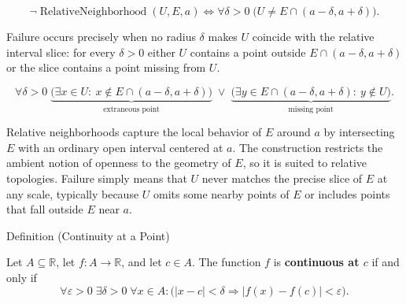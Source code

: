 \begin{remark*}
\[
\neg \operatorname{RelativeNeighborhood}(U,E,a)
\Longleftrightarrow
\forall \delta > 0\;
\bigl(U \ne E \cap (a-\delta, a+\delta)\bigr).
\]
\end{remark*}

\begin{remark*}
Failure occurs precisely when no radius $\delta$ makes $U$ coincide with the relative interval slice: for every $\delta > 0$ either $U$ contains a point outside $E \cap (a-\delta,a+\delta)$ or the slice contains a point missing from $U$.
\end{remark*}

\begin{remark*}
\[
\forall \delta > 0\;
\underbrace{\bigl(\exists x \in U:\ x \notin E \cap (a-\delta,a+\delta)\bigr)}_{\text{extraneous point}}
\;\lor\;
\underbrace{\bigl(\exists y \in E \cap (a-\delta,a+\delta):\ y \notin U\bigr)}_{\text{missing point}}.
\]
\end{remark*}

\begin{remark*}[Interpretation]
Relative neighborhoods capture the local behavior of $E$ around $a$ by intersecting $E$ with an ordinary open interval centered at $a$. The construction restricts the ambient notion of openness to the geometry of $E$, so it is suited to relative topologies. Failure simply means that $U$ never matches the precise slice of $E$ at any scale, typically because $U$ omits some nearby points of $E$ or includes points that fall outside $E$ near $a$.
\end{remark*}

\NoLocalDependencies

\begin{definitionbox}{Definition (Continuity at a Point)}
\begin{definition}
\label{def:continuous-at-point}
Let $A \subseteq \mathbb{R}$, let $f : A \to \mathbb{R}$, and let $c \in A$. The function $f$ is \textbf{continuous at $c$} if and only if
\[
\forall \varepsilon > 0 \;\exists \delta > 0 \;\forall x \in A :
\bigl(|x-c| < \delta \Rightarrow |f(x)-f(c)| < \varepsilon\bigr).
\]
\end{definition}
\end{definitionbox}

